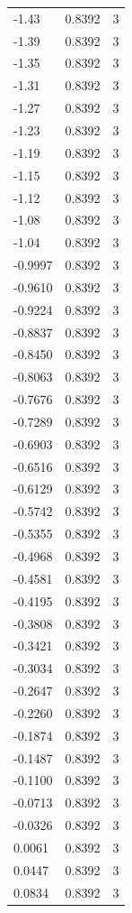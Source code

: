 \begin{longtable}{lrr}
  -1.43 & 0.8392 & 3 \\
  -1.39 & 0.8392 & 3 \\
  -1.35 & 0.8392 & 3 \\
  -1.31 & 0.8392 & 3 \\
  -1.27 & 0.8392 & 3 \\
  -1.23 & 0.8392 & 3 \\
  -1.19 & 0.8392 & 3 \\
  -1.15 & 0.8392 & 3 \\
  -1.12 & 0.8392 & 3 \\
  -1.08 & 0.8392 & 3 \\
  -1.04 & 0.8392 & 3 \\
  -0.9997 & 0.8392 & 3 \\
  -0.9610 & 0.8392 & 3 \\
  -0.9224 & 0.8392 & 3 \\
  -0.8837 & 0.8392 & 3 \\
  -0.8450 & 0.8392 & 3 \\
  -0.8063 & 0.8392 & 3 \\
  -0.7676 & 0.8392 & 3 \\
  -0.7289 & 0.8392 & 3 \\
  -0.6903 & 0.8392 & 3 \\
  -0.6516 & 0.8392 & 3 \\
  -0.6129 & 0.8392 & 3 \\
  -0.5742 & 0.8392 & 3 \\
  -0.5355 & 0.8392 & 3 \\
  -0.4968 & 0.8392 & 3 \\
  -0.4581 & 0.8392 & 3 \\
  -0.4195 & 0.8392 & 3 \\
  -0.3808 & 0.8392 & 3 \\
  -0.3421 & 0.8392 & 3 \\
  -0.3034 & 0.8392 & 3 \\
  -0.2647 & 0.8392 & 3 \\
  -0.2260 & 0.8392 & 3 \\
  -0.1874 & 0.8392 & 3 \\
  -0.1487 & 0.8392 & 3 \\
  -0.1100 & 0.8392 & 3 \\
  -0.0713 & 0.8392 & 3 \\
  -0.0326 & 0.8392 & 3 \\
  0.0061 & 0.8392 & 3 \\
  0.0447 & 0.8392 & 3 \\
  0.0834 & 0.8392 & 3 \\

\end{longtable}
